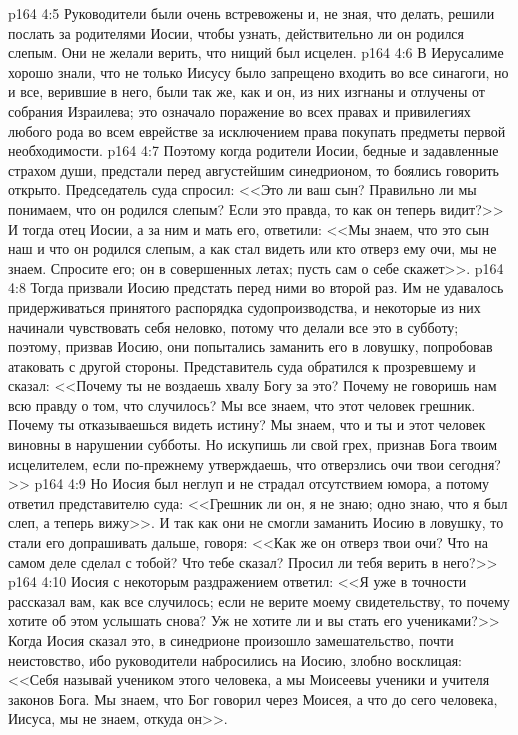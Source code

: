 \vs p164 4:5 Руководители были очень встревожены и, не зная, что делать, решили послать за родителями Иосии, чтобы узнать, действительно ли он родился слепым. Они не желали верить, что нищий был исцелен.
\vs p164 4:6 В Иерусалиме хорошо знали, что не только Иисусу было запрещено входить во все синагоги, но и все, верившие в него, были так же, как и он, из них изгнаны и отлучены от собрания Израилева; это означало поражение во всех правах и привилегиях любого рода во всем еврействе за исключением права покупать предметы первой необходимости.
\vs p164 4:7 Поэтому когда родители Иосии, бедные и задавленные страхом души, предстали перед августейшим синедрионом, то боялись говорить открыто. Председатель суда спросил: <<Это ли ваш сын? Правильно ли мы понимаем, что он родился слепым? Если это правда, то как он теперь видит?>> И тогда отец Иосии, а за ним и мать его, ответили: <<Мы знаем, что это сын наш и что он родился слепым, а как стал видеть или кто отверз ему очи, мы не знаем. Спросите его; он в совершенных летах; пусть сам о себе скажет>>.
\vs p164 4:8 Тогда призвали Иосию предстать перед ними во второй раз. Им не удавалось придерживаться принятого распорядка судопроизводства, и некоторые из них начинали чувствовать себя неловко, потому что делали все это в субботу; поэтому, призвав Иосию, они попытались заманить его в ловушку, попробовав атаковать с другой стороны. Представитель суда обратился к прозревшему и сказал: <<Почему ты не воздаешь хвалу Богу за это? Почему не говоришь нам всю правду о том, что случилось? Мы все знаем, что этот человек грешник. Почему ты отказываешься видеть истину? Мы знаем, что и ты и этот человек виновны в нарушении субботы. Но искупишь ли свой грех, признав Бога твоим исцелителем, если по\hyp{}прежнему утверждаешь, что отверзлись очи твои сегодня?>>
\vs p164 4:9 Но Иосия был неглуп и не страдал отсутствием юмора, а потому ответил представителю суда: <<Грешник ли он, я не знаю; одно знаю, что я был слеп, а теперь вижу>>. И так как они не смогли заманить Иосию в ловушку, то стали его допрашивать дальше, говоря: <<Как же он отверз твои очи? Что на самом деле сделал с тобой? Что тебе сказал? Просил ли тебя верить в него?>>
\vs p164 4:10 Иосия с некоторым раздражением ответил: <<Я уже в точности рассказал вам, как все случилось; если не верите моему свидетельству, то почему хотите об этом услышать снова? Уж не хотите ли и вы стать его учениками?>> Когда Иосия сказал это, в синедрионе произошло замешательство, почти неистовство, ибо руководители набросились на Иосию, злобно восклицая: <<Себя называй учеником этого человека, а мы Моисеевы ученики и учителя законов Бога. Мы знаем, что Бог говорил через Моисея, а что до сего человека, Иисуса, мы не знаем, откуда он>>.
